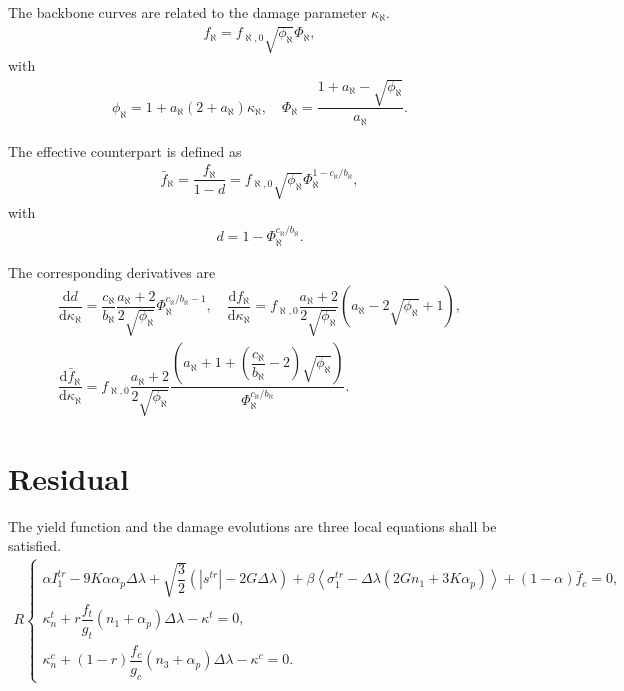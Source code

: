 \documentclass[10pt,fleqn,3p]{elsarticle}
\newcommand*{\md}[1]{\mathrm{d}#1}
\newcommand*{\ddfrac}[2]{\dfrac{\md#1}{\md#2}}
\begin{document}
The backbone curves are related to the damage parameter $\kappa_\aleph$.
\begin{gather*}
f_\aleph=f_{\aleph,0}\sqrt{\phi_\aleph}\Phi_\aleph,
\end{gather*}
with
\begin{gather*}
\phi_\aleph=1+a_\aleph\left(2+a_\aleph\right)\kappa_\aleph,\quad
\Phi_\aleph=\dfrac{1+a_\aleph-\sqrt{\phi_\aleph}}{a_\aleph}.
\end{gather*}

The effective counterpart is defined as
\begin{gather*}
\bar{f}_\aleph=\dfrac{f_\aleph}{1-d}=f_{\aleph,0}\sqrt{\phi_\aleph}\Phi_\aleph^{1-c_\aleph/b_\aleph},
\end{gather*}
with
\begin{gather*}
d=1-\Phi_\aleph^{c_\aleph/b_\aleph}.
\end{gather*}

The corresponding derivatives are
\begin{gather*}
\ddfrac{d}{\kappa_\aleph}=\dfrac{c_\aleph}{b_\aleph}\dfrac{a_\aleph+2}{2\sqrt{\phi_\aleph}}\Phi_\aleph^{c_\aleph/b_\aleph-1},\quad
\ddfrac{f_\aleph}{\kappa_\aleph}=f_{\aleph,0}\dfrac{a_\aleph+2}{2\sqrt{\phi_\aleph}}\left(a_\aleph-2\sqrt{\phi_\aleph}+1\right),\\
\ddfrac{\bar{f}_\aleph}{\kappa_\aleph}=f_{\aleph,0}\dfrac{a_\aleph+2}{2\sqrt{\phi_\aleph}}\dfrac{\left(a_\aleph+1+\left(\dfrac{c_\aleph}{b_\aleph}-2\right)\sqrt{\phi_\aleph}\right)}{\Phi_\aleph^{c_\aleph/b_\aleph}}.
\end{gather*}
\section{Residual}
The yield function and the damage evolutions are three local equations shall be satisfied.
\begin{gather}
R\left\{
\begin{array}{l}
\alpha{}I_1^{tr}-9K\alpha\alpha_p\Delta\lambda+\sqrt{\dfrac{3}{2}}\left(|s^{tr}|-2G\Delta\lambda\right)+\beta\left<\sigma_1^{tr}-\Delta\lambda\left(2Gn_1+3K\alpha_p\right)\right>+\left(1-\alpha\right)\bar{f}_c=0,\\
\kappa^t_n+r\dfrac{f_t}{g_t}(n_1+\alpha_p)\Delta\lambda-\kappa^t=0,\\
\kappa^c_n+(1-r)\dfrac{f_c}{g_c}(n_3+\alpha_p)\Delta\lambda-\kappa^c=0.
\end{array}
\right.
\end{gather}
\end{document}
